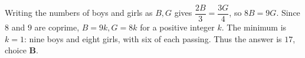 Writing the numbers of boys and girls as $B,G$ gives $\dfrac{2B}{3}=\dfrac{3G}{4}$, so $8B=9G$. Since $8$ and $9$ are coprime, $B=9k,G=8k$ for a positive integer $k$. The minimum is $k=1$: nine boys and eight girls, with six of each passing. Thus the answer is $\boxed{17}$, choice \textbf{B}.
